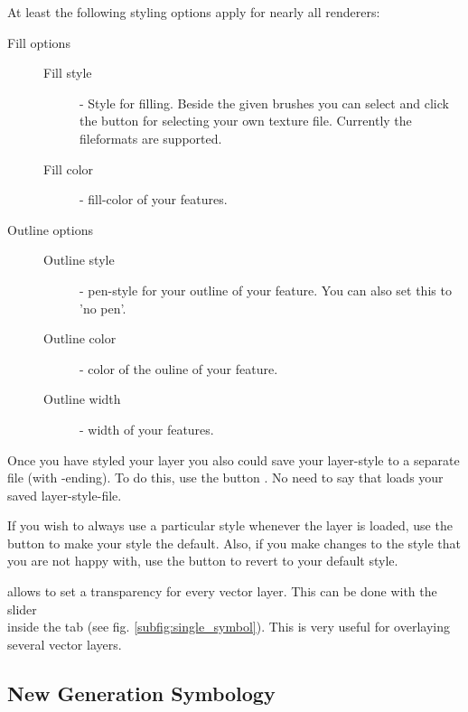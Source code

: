 At least the following styling options apply for nearly all renderers:
\begin{description}
\item[Fill options]
\begin{description}
 \item[Fill style] - Style for filling. Beside the given brushes you can
 select  and click the \browsebutton
 button for selecting your own texture file. Currently the fileformats
  are supported.
 \item[Fill color] - fill-color of your features.
\end{description}
\item[Outline options]
\begin{description}
 \item[Outline style] - pen-style for your outline of your feature. You can
 also set this to 'no pen'.
 \item[Outline color] - color of the ouline of your feature.
 \item[Outline width] - width of your features.
\end{description}
\end{description}

Once you have styled your layer you also could save your layer-style to a
separate file (with -ending).
To do this, use the button . No need to say that
 loads your saved layer-style-file.

If you wish to always use a particular style whenever the layer is loaded,
use the  button to make your style the default. Also,
if you make changes to the style that you are not happy with, use the  button to revert to your default style.

 \label{sec:vect_transparency}

\qg allows to set a transparency for every vector layer. This can be done with
the slider \\
 inside the  tab (see
fig. \ref{subfig:single_symbol}). This is very useful for overlaying several
vector layers.

\subsection{New Generation Symbology}

